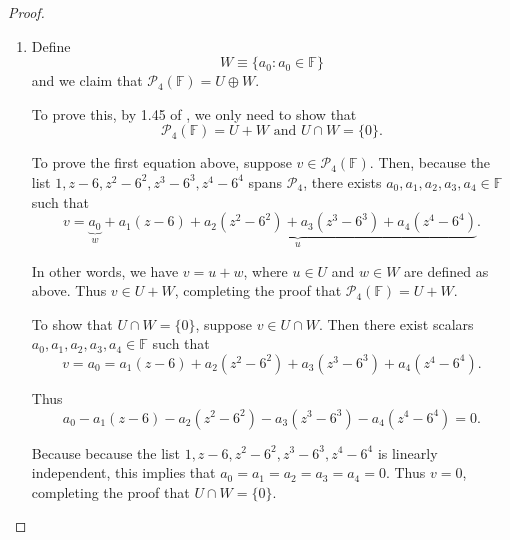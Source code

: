 \begin{proof}
\begin{enumerate}[label=(\alph*)]
Hence the list is linearly independent in $\mathcal{P}_4(\mathbb{F})$. Since $\dim \mathcal{P}_4(\mathbb{F})=5$, 2.39 of \cite{axler2014linear} implies that the list is a basis of $\mathcal{P}_4$.
\item Define\[
W\equiv\{a_0:a_0\in\mathbb{F}\}
\] and we claim that $\mathcal{P}_4(\mathbb{F})=U\oplus W$.

To prove this, by 1.45 of \cite{axler2014linear}, we only need to show that\[
\mathcal{P}_4(\mathbb{F})=U+W\text{ and }U\cap W=\{0\}.
\]

To prove the first equation above, suppose $v\in\mathcal{P}_4(\mathbb{F})$. Then, because the list $1,z-6,z^2-6^2,z^3-6^3,z^4-6^4$ spans $\mathcal{P}_4$, there exists $a_0,a_1,a_2,a_3,a_4\in\mathbb{F}$ such that\[
v=\underbrace{a_0}_w+\underbrace{a_1(z-6)+a_2(z^2-6^2)+a_3(z^3-6^3)+a_4(z^4-6^4)}_u.
\]

In other words, we have $v=u+w$, where $u\in U$ and $w\in W$ are defined as above. Thus $v\in U+W$, completing the proof that $\mathcal{P}_4(\mathbb{F})=U+W$.

To show that $U\cap W=\{0\}$, suppose $v\in U\cap W$. Then there exist scalars $a_0,a_1,a_2,a_3,a_4\in\mathbb{F}$ such that\[
v=a_0=a_1(z-6)+a_2(z^2-6^2)+a_3(z^3-6^3)+a_4(z^4-6^4).
\]

Thus\[
a_0-a_1(z-6)-a_2(z^2-6^2)-a_3(z^3-6^3)-a_4(z^4-6^4)=0.
\]

Because because the list $1,z-6,z^2-6^2,z^3-6^3,z^4-6^4$ is linearly independent, this implies that $a_0=a_1=a_2=a_3=a_4=0$. Thus $v=0$, completing the proof that $U\cap W=\{0\}$.
\end{enumerate}
\end{proof}


